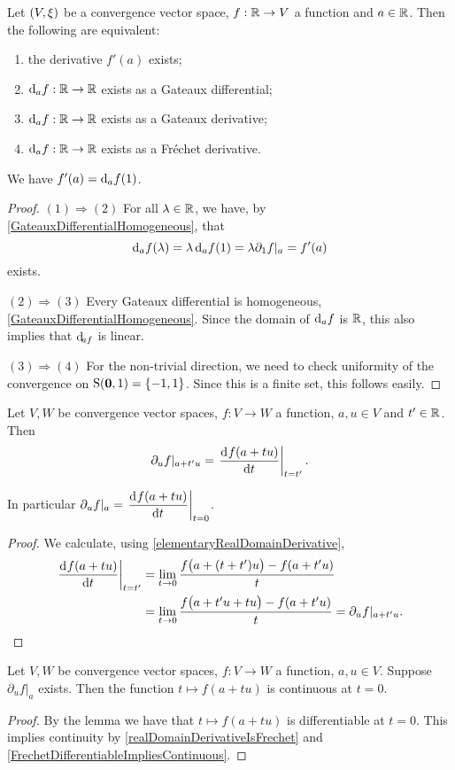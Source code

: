 \begin{proposition} \label{realDomainDerivativeIsFrechet}
Let $\sSet{V,\xi}$ be a convergence vector space, $f: \mathbb{R} \to V$ a function and $a\in \mathbb{R}$. Then the following are equivalent:
\begin{enumerate}
\item the derivative $f'(a)$ exists;
\item $\operatorname{d \!}{_af}: \mathbb{R} \to \mathbb{R}$ exists as a Gateaux differential;
\item $\operatorname{d \!}{_af}: \mathbb{R} \to \mathbb{R}$ exists as a Gateaux derivative;
\item $\operatorname{d \!}{_af}: \mathbb{R} \to \mathbb{R}$ exists as a Fréchet derivative.
\end{enumerate}
\end{proposition}
We have $f'(a) = \operatorname{d \!}{_af}(1)$.
\begin{proof}
$(1) \Rightarrow (2)$ For all $\lambda \in \mathbb{R}$, we have, by \ref{GateauxDifferentialHomogeneous}, that
\[ \operatorname{d \!}{_af}(\lambda) = \lambda \operatorname{d \!}{_af}(1) = \lambda \partial_1f|_a = f'(a) \]
exists.

$(2) \Rightarrow (3)$ Every Gateaux differential is homogeneous, \ref{GateauxDifferentialHomogeneous}. Since the domain of $\operatorname{d \!}{_af}$ is $\mathbb{R}$, this also implies that $\operatorname{d \!}_{af}$ is linear.

$(3) \Rightarrow (4)$ For the non-trivial direction, we need to check uniformity of the convergence on $\operatorname{S}(\boldsymbol{\mathrm{0}}, 1) = \{-1,1\}$. Since this is a finite set, this follows easily.
\end{proof}



\begin{lemma} \label{directionalDerivativeAsOD}
Let $V,W$ be convergence vector spaces, $f: V\to W$ a function, $a,u\in V$ and $t'\in \mathbb{R}$. Then
\[ \partial_u f|_{a+t'u} = \left.\mathinner{ \dfrac{\operatorname{d \!}{^{}}f(a+tu)}{\operatorname{d \!}{{t}^{}}} }\right|_{t=t'}. \]
\end{lemma}
In particular $\partial_u f|_a = \left.\mathinner{ \dfrac{\operatorname{d \!}{^{}}f(a+tu)}{\operatorname{d \!}{{t}^{}}} }\right|_{t=0}$.
\begin{proof}
We calculate, using \ref{elementaryRealDomainDerivative},
\begin{align*}
\left.\mathinner{ \dfrac{\operatorname{d \!}{^{}}f(a+tu)}{\operatorname{d \!}{{t}^{}}} }\right|_{t=t'} &= \lim_{t\to 0}\frac{f\big(a+(t+t')u\big) - f(a+t'u)}{t} \\
&= \lim_{t\to 0}\frac{f\big(a+t'u + tu \big) - f(a+t'u)}{t} = \partial_uf|_{a+t'u}.
\end{align*}
\end{proof}
\begin{corollary} \label{partialDerivativeImpliesContinuityAlongLine}
Let $V,W$ be convergence vector spaces, $f: V\to W$ a function, $a,u\in V$. Suppose $\partial_uf|_a$ exists. Then the function $t\mapsto f(a+tu)$ is continuous at $t=0$.
\end{corollary}
\begin{proof}
By the lemma we have that $t\mapsto f(a+tu)$ is differentiable at $t=0$. This implies continuity by \ref{realDomainDerivativeIsFrechet} and \ref{FrechetDifferentiableImpliesContinuous}.
\end{proof}






